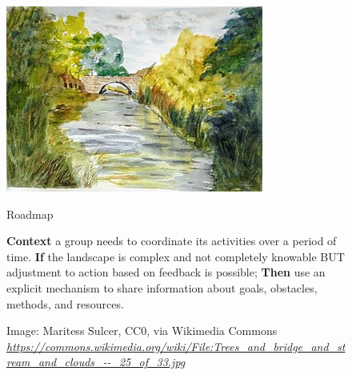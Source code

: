 \documentclass{article}
\begin{document}
\begin{figure}[h]
\begin{adjustbox}{minipage=[c]{\textwidth-10mm},margin= 5mm 25mm 5mm 15mm, frame=1pt, bgcolor=almond,env=center}%
\begin{center}
\includegraphics[width=.9\columnwidth]{image1.jpg}
\end{center}
\begin{center}
\begin{minipage}[t]{0.97\columnwidth}\raggedright
\medskip
{\huge Roadmap}
\bigskip

\Large
\textbf{Context} a group needs to coordinate its activities over a period of time.\newline
\textbf{If} the landscape is complex and not completely knowable BUT adjustment to action based on feedback is possible;\newline
\textbf{Then} use an explicit mechanism to share information about goals, obstacles, methods, and resources.\newline\smallskip
\bigskip


\end{minipage}
\end{center}
\vspace{1cm}
\caption*{Image: Maritess Sulcer, CC0, via Wikimedia
Commons\newline
\href{https://commons.wikimedia.org/wiki/File:Trees_and_bridge_and_stream_and_clouds_--_25_of_33.jpg}{\emph{https://commons.wikimedia.org/wiki/File:Trees\_and\_bridge\_and\_stream\_and\_clouds\_-\/-\_25\_of\_33.jpg}}}
\end{adjustbox}
\end{figure}
\end{document}
